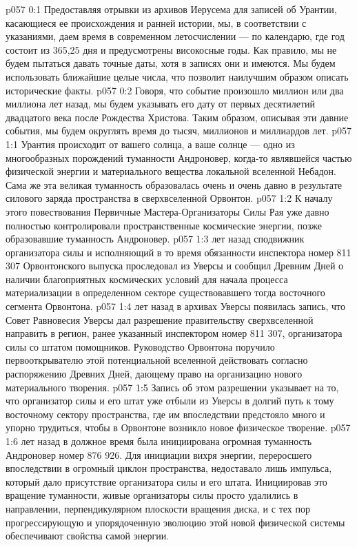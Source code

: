 \author{Носитель Жизни}
\vs p057 0:1 Предоставляя отрывки из архивов Иерусема для записей об Урантии, касающиеся ее происхождения и ранней истории, мы, в соответствии с указаниями, даем время в современном летосчислении --- по календарю, где год состоит из 365,25 дня и предусмотрены високосные годы. Как правило, мы не будем пытаться давать точные даты, хотя в записях они и имеются. Мы будем использовать ближайшие целые числа, что позволит наилучшим образом описать исторические факты.
\vs p057 0:2 Говоря, что событие произошло миллион или два миллиона лет назад, мы будем указывать его дату от первых десятилетий двадцатого века после Рождества Христова. Таким образом, описывая эти давние события, мы будем округлять время до тысяч, миллионов и миллиардов лет.
\vs p057 1:1 Урантия происходит от вашего солнца, а ваше солнце --- одно из многообразных порождений туманности Андроновер, когда\hyp{}то являвшейся частью физической энергии и материального вещества локальной вселенной Небадон. Сама же эта великая туманность образовалась очень и очень давно в результате силового заряда пространства в сверхвселенной Орвонтон.
\vs p057 1:2 К началу этого повествования Первичные Мастера\hyp{}Организаторы Силы Рая уже давно полностью контролировали пространственные космические энергии, позже образовавшие туманность Андроновер.
\vs p057 1:3 \pc {} лет назад сподвижник организатора силы и исполняющий в то время обязанности инспектора номер 811 307 Орвонтонского выпуска проследовал из Уверсы и сообщил Древним Дней о наличии благоприятных космических условий для начала процесса материализации в определенном секторе существовавшего тогда восточного сегмента Орвонтона.
\vs p057 1:4 \pc {} лет назад в архивах Уверсы появилась запись, что Совет Равновесия Уверсы дал разрешение правительству сверхвселенной направить в регион, ранее указанный инспектором номер 811 307, организатора силы со штатом помощников. Руководство Орвонтона поручило первооткрывателю этой потенциальной вселенной действовать согласно распоряжению Древних Дней, дающему право на организацию нового материального творения.
\vs p057 1:5 Запись об этом разрешении указывает на то, что организатор силы и его штат уже отбыли из Уверсы в долгий путь к тому восточному сектору пространства, где им впоследствии предстояло много и упорно трудиться, чтобы в Орвонтоне возникло новое физическое творение.
\vs p057 1:6 \pc {} лет назад в должное время была инициирована огромная туманность Андроновер номер 876 926. Для инициации вихря энергии, переросшего впоследствии в огромный циклон пространства, недоставало лишь импульса, который дало присутствие организатора силы и его штата. Инициировав это вращение туманности, живые организаторы силы просто удалились в направлении, перпендикулярном плоскости вращения диска, и с тех пор прогрессирующую и упорядоченную эволюцию этой новой физической системы обеспечивают свойства самой энергии.
